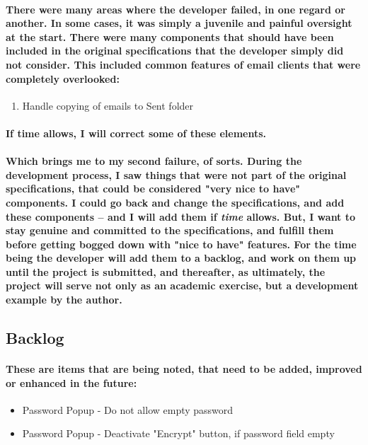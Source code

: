 \paragraph{There were many areas where the developer failed, in one regard or another. In some cases, it was simply a juvenile and painful oversight at the start. There were many components that should have been included in the original specifications that the developer simply did not consider. This included common features of email clients that were completely overlooked:} 

\begin{enumerate}
\item Handle copying of emails to Sent folder
\end{enumerate}

\paragraph{If time allows, I will correct some of these elements.}

\paragraph{Which brings me to my second failure, of sorts. During the development process, I saw things that were not part of the original specifications, that could be considered "very nice to have" components. I could go back and change the specifications, and add these components -- and I will add them if \emph{time} allows. But, I want to stay genuine and committed to the specifications, and fulfill them before getting bogged down with "nice to have" features. For the time being the developer will add them to a backlog, and work on them up until the project is submitted, and thereafter, as ultimately, the project will serve not only as an academic exercise, but a development example by the author.}

\subsection{Backlog}
\paragraph{These are items that are being noted, that need to be added, improved or enhanced in the future:}

\begin{itemize}
\item Password Popup - Do not allow empty password
\item Password Popup - Deactivate "Encrypt" button, if password field empty
\end{itemize}